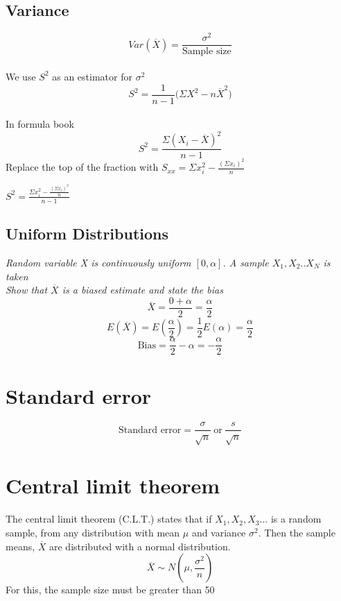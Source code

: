 \documentclass{article}[18pt]
\begin{document}
\subsection{Variance}
$$Var(\overline{X})=\frac{\sigma^2}{\textrm{Sample size}}$$
\\
We use $S^2$ as an estimator for $\sigma^2$
$$S^2=\frac{1}{n-1}\Big(\Sigma X^2-n\overline{X}^2\Big)$$
\\
In formula book
$$S^2=\frac{\Sigma(X_i-\overline{X})^2}{n-1}$$
Replace the top of the fraction with $S_{xx}=\Sigma x^2_i-\frac{(\Sigma x_i)^2}{n}$
\begin{center}
{\huge$S^2=\frac{\Sigma x_i^2-\frac{(\Sigma x_i)^2}{n}}{n-1}$}
\end{center}
\subsection{Uniform Distributions}
\textit{Random variable X is continuously uniform $[0,\alpha]$. A sample $X_1,X_2..X_N$ is taken}\\
\textit{Show that $\overline{X}$ is a biased estimate and state the bias}
$$\overline{X}=\frac{0+\alpha}{2}=\frac{\alpha}{2}$$
$$E(\overline{X})=E(\frac{\alpha}{2})=\frac{1}{2}E(\alpha)=\frac{\alpha}{2}$$
$$\textrm{Bias}=\frac{\alpha}{2}-\alpha=-\frac{\alpha}{2}$$
\newpage
\section{Standard error}
$$\textrm{Standard error}=\frac{\sigma}{\sqrt{n}} \ \textrm{or} \ \frac{s}{\sqrt{n}}$$
\section{Central limit theorem}
The central limit theorem (C.L.T.) states that if $X_1,X_2,X_3...$ is a random sample, from any distribution with mean $\mu$ and variance $\sigma^2$. Then the sample means, $\overline{X}$ are distributed with a normal distribution.
$$\overline{X}\sim N(\mu,\frac{\sigma^2}{n})$$ 
For this, the sample size must be greater than 50
\end{document}
